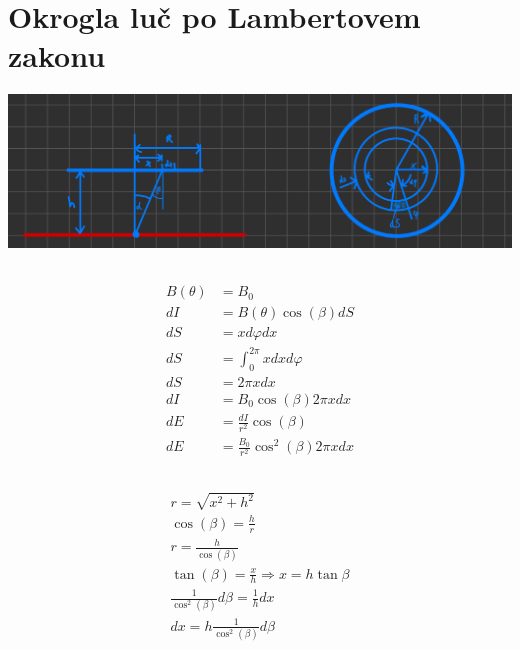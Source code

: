 \documentclass[a4paper,12pt]{article}
\begin{document}
\newpage
\section{Okrogla luč po Lambertovem zakonu}
\includegraphics[width=\textwidth]{lambertova_luc.png}
\subsection{}
\begin{align}
    B(\theta) & = B_0                                      \\
    dI        & = B(\theta) \cos(\beta) dS                 \\
    dS        & = x d\varphi dx                            \\
    dS        & = \int_0^{2 \pi} x dx d\varphi             \\
    dS        & = 2 \pi x dx                               \\
    dI        & = B_0 \cos(\beta) 2 \pi x dx               \\
    dE        & = \frac{dI}{r^2} \cos(\beta)               \\
    dE        & = \frac{B_0}{r^2} \cos^2(\beta) 2 \pi x dx
\end{align}

\subsection{}
\begin{align}
    r = \sqrt{x^2 + h^2}                                     \\
    \cos(\beta) = \frac{h}{r}                                \\
    r = \frac{h}{\cos(\beta)}                                \\
    \tan(\beta)  = \frac{x}{h} \Rightarrow x = h \tan{\beta} \\
    \frac{1}{\cos^2(\beta)} d \beta = \frac{1}{h} dx         \\
    dx = h \frac{1}{\cos^2(\beta)} d\beta
\end{align}
\end{document}
